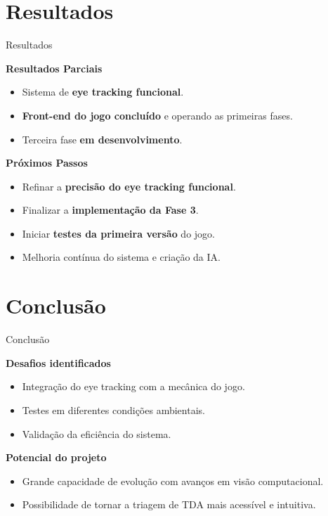 \documentclass{beamer}
\begin{document}
\section[Resultados \\ \footnotesize(10)]{Resultados}
\begin{frame}{Resultados}
\justifying
\centering

\vspace{0.5cm}
{\Large\textbf{Resultados Parciais}}

\begin{itemize}
    \item Sistema de \textbf{eye tracking funcional}.
    \item \textbf{Front-end do jogo concluído} e operando as primeiras fases.
    \item Terceira fase \textbf{em desenvolvimento}.
\end{itemize}

\centering

\vspace{0.5cm}
{\Large\textbf{Próximos Passos}}

\begin{itemize}
    \item Refinar a \textbf{precisão do eye tracking funcional}.
    \item Finalizar a \textbf{implementação da Fase 3}.
    \item Iniciar \textbf{testes da primeira versão} do jogo.
    \item Melhoria contínua do sistema e criação da IA.
\end{itemize}

\end{frame}

\section[Conclusão \\ \footnotesize(11)]{Conclusão}

\begin{frame}{Conclusão}
\justifying

\vspace{0.5cm}
{\Large\textbf{Desafios identificados}}

\begin{itemize}
    \item Integração do eye tracking com a mecânica do jogo.
    \item Testes em diferentes condições ambientais.
    \item Validação da eficiência do sistema.
\end{itemize}

\vspace{0.5cm}
{\Large\textbf{Potencial do projeto}}

\begin{itemize}
    \item Grande capacidade de evolução com avanços em visão computacional.
    \item Possibilidade de tornar a triagem de TDA mais acessível e intuitiva.
\end{itemize}

\end{frame}
\end{document}

